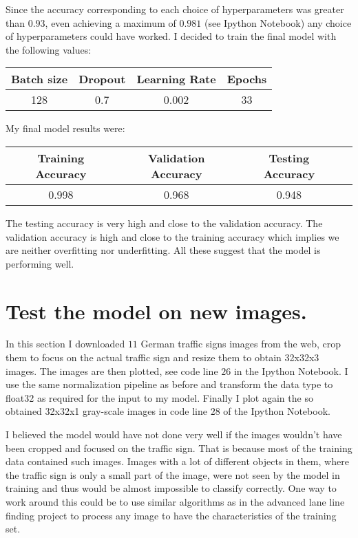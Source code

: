\documentclass[11pt, a4paper]{amsart}
\begin{document}
Since the accuracy corresponding to each choice of hyperparameters was greater than $0.93$, even achieving a maximum of $0.981$ (see Ipython Notebook) any choice of hyperparameters could have worked. I decided to train the final model with the following values: 
\begin{center}
\begin{tabular}{|c|c|c|c|}
\hline
Batch size & Dropout & Learning Rate & Epochs \\ \hline
128 & 0.7 & 0.002 & 33  \\ \hline
\end{tabular}
\end{center}
\noindent
\newline
\noindent 
My final model results were: 
\begin{center}
\begin{tabular}{|c|c|c|c|}
\hline
Training Accuracy & Validation Accuracy & Testing Accuracy \\ \hline
0.998 & 0.968 & 0.948 \\ \hline
\end{tabular}
\end{center}
\noindent
\newline
\noindent 
The testing accuracy is very high and close to the validation accuracy. The validation accuracy is high and close to the training accuracy which implies we are neither overfitting nor underfitting.  All these suggest that the model is performing well. 

       \section{Test the model on new images.}
       In this section I downloaded $11$ German traffic signs images from the web, crop them to focus on the actual traffic sign and resize them to obtain 32x32x3 images. The images are then plotted, see code line $26$ in the Ipython Notebook. I use the same normalization pipeline as before and transform the data type to float32 as required for the input to my model. Finally I plot again the so obtained 32x32x1 gray-scale images in code line $28$ of the Ipython Notebook. 
       
       I believed the model would have not done very well if the images wouldn't have been cropped and focused on the traffic sign. That is because most of the training data contained such images. Images with a lot of different objects in them, where the traffic sign is only a small part of the image, were not seen by the model in training and thus would be almost impossible to classify correctly. One way to work around this could be to use similar algorithms as in the advanced lane line finding project to process any image to have the characteristics of the training set. 
       
\end{document}

